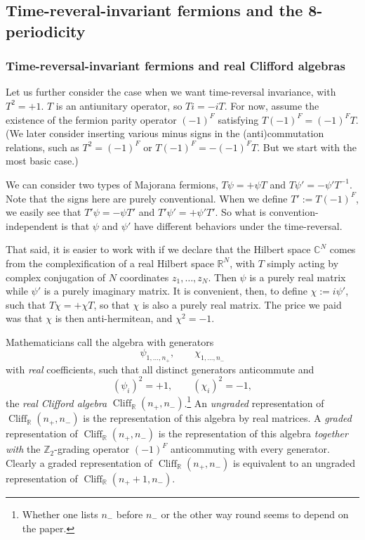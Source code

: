 \documentclass[12pt]{article}
\numberwithin{equation}{section}
\numberwithin{figure}{section}
\theoremstyle{remark}
\def\bC{\mathbb{C}}
\def\bR{\mathbb{R}}
\def\bZ{\mathbb{Z}}
\def\Cliff{\mathop{\mathrm{Cliff}}\nolimits}
\begin{document}
\subsection{Time-reveral-invariant fermions and the 8-periodicity}

\subsubsection{Time-reversal-invariant fermions and real Clifford algebras}
Let us further consider the case when we want time-reversal invariance, with $T^2=+1$.
$T$ is an antiunitary operator, so $Ti=-iT$.
For now, assume the existence of the fermion parity operator $(-1)^F$ satisfying
$T(-1)^F = (-1)^FT$.
(We later consider inserting various minus signs in the (anti)commutation relations,
such as $T^2=(-1)^F$ or $T(-1)^F=-(-1)^FT$. 
But we start with the most basic case.)

We can consider two types of Majorana fermions, $T\psi =+\psi T$ and $T\psi'  = -\psi'T^{-1}$.
Note that the signs here are purely conventional.
When we define $T' :=T(-1)^F$,
we easily see that $T'\psi = -\psi T'$ and $T'\psi' = + \psi' T'$.
So what is convention-independent is that $\psi$ and $\psi'$ have different behaviors under the time-reversal.

That said, it is easier to work with if we declare that the Hilbert space $\bC^N$ comes from
the complexification of a real Hilbert space $\bR^N$, with $T$ 
simply acting by complex conjugation of $N$ coordinates $z_1,\ldots,z_N$.
Then $\psi$ is a purely real matrix while $\psi'$ is a purely imaginary matrix.
It is convenient, then, to define $\chi := i\psi'$, such that $T\chi = +\chi T$,
so that $\chi$ is also a purely real matrix.
The price we paid was that $\chi$ is then anti-hermitean, and $\chi^2=-1$.

Mathematicians call the algebra with generators \begin{equation}
\psi_{1,\ldots,n_+}, \qquad \chi_{1,\ldots,n_-}
\end{equation} with \emph{real} coefficients,
such that all distinct generators anticommute and \begin{equation}
(\psi_i)^2=+1, \qquad (\chi_i)^2=-1,
\end{equation} the \emph{real Clifford algebra} $\Cliff_\bR(n_+,n_-)$.\footnote{%
Whether one lists $n_-$ before $n_-$ or the other way round seems to depend on the paper.
}
An \emph{ungraded} representation of $\Cliff_\bR(n_+,n_-)$ is the representation of this algebra
by real matrices.
A \emph{graded} representation of $\Cliff_\bR(n_+,n_-)$ is the representation of this algebra
\emph{together with} the $\bZ_2$-grading operator $(-1)^F$ anticommuting with 
every generator.
Clearly a graded representation of $\Cliff_\bR(n_+,n_-)$ is equivalent to an ungraded representation of $\Cliff_\bR(n_++1,n_-)$.
\end{document}
